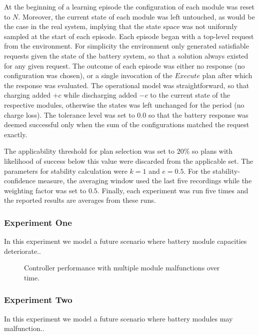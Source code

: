 At the beginning of a learning episode the configuration of each module was reset to $N$. Moreover, the current state of each module was left untouched, as would be the case in the real system, implying that the state space was not uniformly sampled at the start of each episode. Each episode began with a top-level request from the environment. For simplicity the environment only generated satisfiable requests given the state of the battery system, so that a solution always existed for any given request. The outcome of each episode was either no response (no configuration was chosen), or a single invocation of the $Execute$ plan after which the response was evaluated. The operational model was straightforward, so that charging added $+c$ while discharging added $-c$ to the current state of the respective modules, otherwise the states was left unchanged for the period (no charge loss). The tolerance level was set to $0.0$ so that the battery response was deemed successful only when the sum of the configurations matched the request exactly.

The applicability threshold for plan selection was set to $20\%$ so plans with likelihood of success below this value were discarded from the applicable set. The parameters for stability calculation were $k=1$ and $e=0.5$. For the stability-confidence measure, the averaging window used the last five recordings while the weighting factor was set to $0.5$. Finally, each experiment was run five times and the reported results are averages from these runs.

\subsubsection{Experiment One}

In this experiment we model a future scenario where battery module capacities deteriorate..

\begin{figure}[ht]
\begin{center}

\end{center}
\caption{Controller performance with multiple module malfunctions over time.}
\label{fig:experiment1}
\end{figure}

\subsubsection{Experiment Two}

In this experiment we model a future scenario where battery modules may malfunction..

